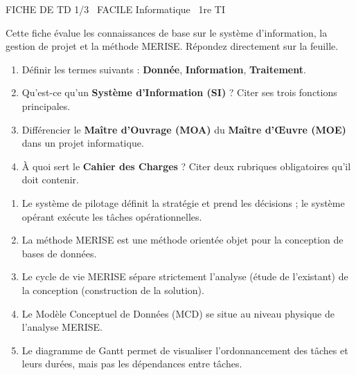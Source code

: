 \documentclass[11pt]{article}
\begin{document}
\begin{tcolorbox}[enhanced,colback=popink,colframe=popink,arc=10pt,boxrule=0pt,left=12pt,right=12pt,top=9pt,bottom=9pt]
{\color{white}\popxbold\small FICHE DE TD 1/3 \textbullet\ FACILE \hfill Informatique \textbullet\ 1re TI\par}
\end{tcolorbox}
\vspace{4pt}
\noindent Cette fiche évalue les connaissances de base sur le système d'information, la gestion de projet et la méthode MERISE. Répondez directement sur la feuille.

\begin{exercice}
\begin{enumerate}
    \item Définir les termes suivants : \textbf{Donnée}, \textbf{Information}, \textbf{Traitement}.
    \item Qu'est-ce qu'un \textbf{Système d'Information (SI)} ? Citer ses trois fonctions principales.
    \item Différencier le \textbf{Maître d'Ouvrage (MOA)} du \textbf{Maître d'Œuvre (MOE)} dans un projet informatique.
    \item À quoi sert le \textbf{Cahier des Charges} ? Citer deux rubriques obligatoires qu'il doit contenir.
\end{enumerate}
\end{exercice}

\begin{exercice}
\begin{enumerate}
    \item Le système de pilotage définit la stratégie et prend les décisions ; le système opérant exécute les tâches opérationnelles.
    \item La méthode MERISE est une méthode orientée objet pour la conception de bases de données.
    \item Le cycle de vie MERISE sépare strictement l'analyse (étude de l'existant) de la conception (construction de la solution).
    \item Le Modèle Conceptuel de Données (MCD) se situe au niveau physique de l'analyse MERISE.
    \item Le diagramme de Gantt permet de visualiser l'ordonnancement des tâches et leurs durées, mais pas les dépendances entre tâches.
\end{enumerate}
\end{exercice}
\end{document}
